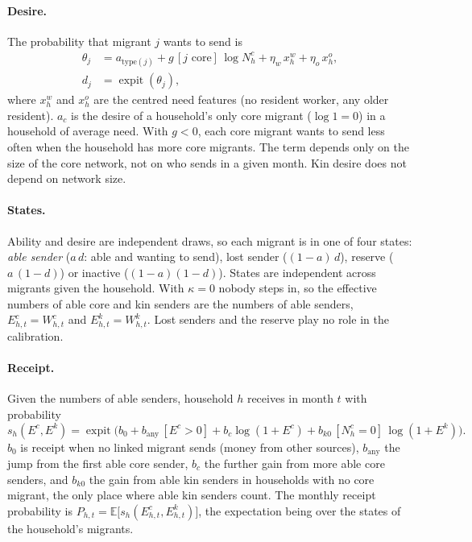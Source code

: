 \documentclass[11pt]{article}
\newcommand{\expit}{\operatorname{expit}}
\begin{document}
\paragraph{Desire.} The probability that migrant $j$ wants to send is
\begin{align}
\theta_j &= a_{\text{type}(j)} + g\,[j \text{ core}]\,\log N^c_h + \eta_w\,x^w_h + \eta_o\,x^o_h, \\
d_j &= \expit(\theta_j),
\end{align}
where $x^w_h$ and $x^o_h$ are the centred need features (no resident worker, any older resident). $a_c$ is the desire of a household's only core migrant ($\log 1 = 0$) in a household of average need. With $g < 0$, each core migrant wants to send less often when the household has more core migrants. The term depends only on the size of the core network, not on who sends in a given month. Kin desire does not depend on network size.

\paragraph{States.} Ability and desire are independent draws, so each migrant is in one of four states: \emph{able sender} ($a\,d$: able and wanting to send), lost sender ($(1-a)\,d$), reserve ($a\,(1-d)$) or inactive ($(1-a)(1-d)$). States are independent across migrants given the household. With $\kappa = 0$ nobody steps in, so the effective numbers of able core and kin senders are the numbers of able senders, $E^c_{h,t} = W^c_{h,t}$ and $E^k_{h,t} = W^k_{h,t}$. Lost senders and the reserve play no role in the calibration.

\paragraph{Receipt.} Given the numbers of able senders, household $h$ receives in month $t$ with probability
\begin{equation}
s_h(E^c, E^k) = \expit\Big(b_0 + b_{\text{any}}\,[E^c > 0] + b_c \log(1 + E^c) + b_{k0}\,[N^c_h = 0]\,\log(1 + E^k)\Big).
\label{eq:receipt}
\end{equation}
$b_0$ is receipt when no linked migrant sends (money from other sources), $b_{\text{any}}$ the jump from the first able core sender, $b_c$ the further gain from more able core senders, and $b_{k0}$ the gain from able kin senders in households with no core migrant, the only place where able kin senders count. The monthly receipt probability is $P_{h,t} = \mathbb{E}\big[s_h(E^c_{h,t}, E^k_{h,t})\big]$, the expectation being over the states of the household's migrants.
\end{document}
